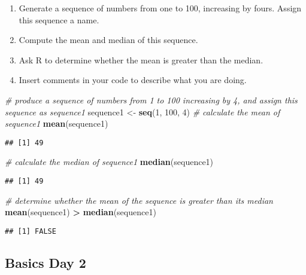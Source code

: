 \documentclass[]{article}
\newenvironment{Shaded}{\begin{snugshade}}{\end{snugshade}}
\newcommand{\KeywordTok}[1]{\textcolor[rgb]{0.13,0.29,0.53}{\textbf{#1}}}
\newcommand{\DecValTok}[1]{\textcolor[rgb]{0.00,0.00,0.81}{#1}}
\newcommand{\StringTok}[1]{\textcolor[rgb]{0.31,0.60,0.02}{#1}}
\newcommand{\CommentTok}[1]{\textcolor[rgb]{0.56,0.35,0.01}{\textit{#1}}}
\newcommand{\OperatorTok}[1]{\textcolor[rgb]{0.81,0.36,0.00}{\textbf{#1}}}
\newcommand{\NormalTok}[1]{#1}
\begin{document}
\begin{enumerate}
\def\labelenumi{\arabic{enumi}.}
\item
  Generate a sequence of numbers from one to 100, increasing by fours.
  Assign this sequence a name.
\item
  Compute the mean and median of this sequence.
\item
  Ask R to determine whether the mean is greater than the median.
\item
  Insert comments in your code to describe what you are doing.
\end{enumerate}

\begin{Shaded}
\begin{Highlighting}[]
\CommentTok{# produce a sequence of numbers from 1 to 100 increasing by 4, and assign this sequence as sequence1}
\NormalTok{sequence1 <-}\StringTok{ }\KeywordTok{seq}\NormalTok{(}\DecValTok{1}\NormalTok{, }\DecValTok{100}\NormalTok{, }\DecValTok{4}\NormalTok{) }
\CommentTok{# calculate the mean of sequence1}
\KeywordTok{mean}\NormalTok{(sequence1) }
\end{Highlighting}
\end{Shaded}

\begin{verbatim}
## [1] 49
\end{verbatim}

\begin{Shaded}
\begin{Highlighting}[]
\CommentTok{# calculate the median of sequence1}
\KeywordTok{median}\NormalTok{(sequence1)}
\end{Highlighting}
\end{Shaded}

\begin{verbatim}
## [1] 49
\end{verbatim}

\begin{Shaded}
\begin{Highlighting}[]
\CommentTok{# determine whether the mean of the sequence is greater than its median}
\KeywordTok{mean}\NormalTok{(sequence1) }\OperatorTok{>}\StringTok{ }\KeywordTok{median}\NormalTok{(sequence1)}
\end{Highlighting}
\end{Shaded}

\begin{verbatim}
## [1] FALSE
\end{verbatim}

\subsection{Basics Day 2}\label{basics-day-2}
\end{document}
